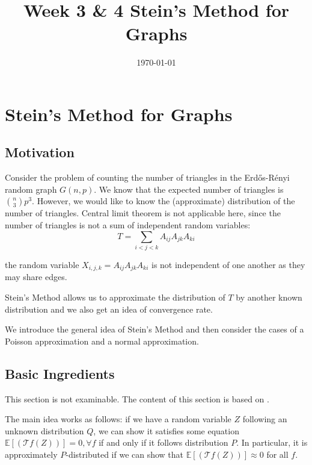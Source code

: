 \documentclass{article}
\title{Week 3 \& 4 Stein's Method for Graphs}
\date{\today}
\begin{document}
\maketitle

\section{Stein's Method for Graphs}

\subsection{Motivation}
Consider the problem of counting the number of triangles in the Erd\H{o}s-R\'{e}nyi random graph $G(n,p)$. We know that the expected number of triangles is $\binom{n}{3}p^3$. However, we would like to know the (approximate) distribution of the number of triangles. Central limit theorem is not applicable here, since the number of triangles is not a sum of independent random variables: 
\begin{equation*}
    T=\sum_{i<j<k} A_{ij}A_{jk}A_{ki}
\end{equation*}

the random variable $X_{i,j,k}=A_{ij}A_{jk}A_{ki}$ is not independent of one another as they may share edges.  

Stein's Method allows us to approximate the distribution of $T$ by another known distribution and we also get an idea of convergence rate.  

We introduce the general idea of Stein's Method and then consider the cases of a Poisson approximation and a normal approximation.

\subsection{Basic Ingredients}

\begin{unexaminable}
    This section is not examinable. The content of this section is based on \citep{anastasiou2022steins}.
\end{unexaminable}

The main idea works as follows: if we have a random variable $Z$ following an unknown distribution $Q$, we can show it satisfies some equation $\mathbb{E}[(\mathcal{T}f (Z))]=0, \forall f$ if and only if it follows distribution $P$. In particular, it is approximately $P$-distributed if we can show that $\mathbb{E}[(\mathcal{T}f (Z))]\approx 0$ for all $f$.  
\end{document}

